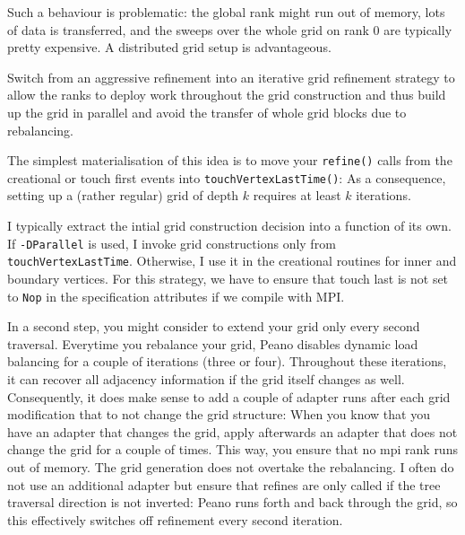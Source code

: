 Such a behaviour is problematic: the global rank might run out of memory, lots
of data is transferred, and the sweeps over the whole grid on rank 0 are
typically pretty expensive. 
A distributed grid setup is advantageous.

\begin{solution}
Switch from an aggressive
refinement into an iterative grid refinement strategy to allow the ranks to
deploy work throughout the grid construction and thus build up the grid in parallel and avoid the transfer of whole grid
blocks due to rebalancing.
\end{solution}

\noindent
The simplest materialisation of this idea is to 
move your \texttt{refine()} calls from the creational or touch first
events into \texttt{touchVertexLastTime()}:
As a consequence, setting up a (rather regular) grid of depth $k$ requires at
least $k$ iterations.

\begin{remark}
 I typically extract the intial grid construction decision into a function of 
 its own. If \texttt{-DParallel} is used, I invoke grid constructions only 
 from \texttt{touchVertexLastTime}. Otherwise, I use it in the creational 
 routines for inner and boundary vertices. For this strategy, we have to ensure
 that touch last is not set to \texttt{Nop} in the specification attributes if
 we compile with MPI.
\end{remark}

In a second step, you might consider to extend your grid only every second
traversal.
Everytime you rebalance your grid, Peano disables dynamic load balancing
for a couple of iterations (three or four). Throughout these iterations, it
can recover all adjacency information if the grid itself changes as well.
Consequently, it does make sense to add a couple of adapter runs after each
grid modification that to not change the grid structure: When you know that
you have an adapter that changes the grid, apply afterwards an adapter that
does not change the grid for a couple of times. This way, you ensure that no
mpi rank runs out of memory. The grid generation does not overtake the rebalancing.
I often do not use an additional adapter but ensure that refines are only called
if the tree traversal direction is not inverted: 
Peano runs forth and back through the grid, so this effectively switches off
refinement every second iteration. 

